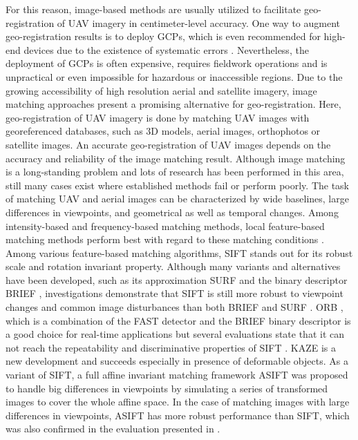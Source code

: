 For this reason, image-based methods are usually utilized to facilitate geo-registration of UAV imagery in centimeter-level accuracy.
One way to augment geo-registration results is to deploy GCPs, which is even recommended for high-end devices due to the existence of systematic errors \cite{gerke2016accuracy}. 
Nevertheless, the deployment of GCPs is often expensive, requires fieldwork operations and is unpractical or even impossible for hazardous or inaccessible regions. 
Due to the growing accessibility of high resolution aerial and satellite imagery, image matching approaches present a promising alternative for geo-registration. 
Here, geo-registration of UAV imagery is done by matching UAV images with georeferenced databases, such as 3D models, aerial images, orthophotos or satellite images.
An accurate geo-registration of UAV images depends on the accuracy and reliability of the image matching result.
Although image matching is a long-standing problem and lots of research has been performed in this area, still many cases exist where established methods fail or perform poorly.
The task of matching UAV and aerial images can be characterized by wide baselines, large differences in viewpoints, and geometrical as well as temporal changes.
Among intensity-based and frequency-based matching methods, local feature-based matching methods perform best with regard to these matching conditions \cite{zitova2003image}.
Among various feature-based matching algorithms, SIFT \cite{lowe2004distinctive} stands out for its robust scale and rotation invariant property. 
Although many variants and alternatives have been developed, such as its approximation SURF \cite{bay2008speeded} and the binary descriptor BRIEF \cite{calonder2010brief}, investigations demonstrate that SIFT is still more robust to viewpoint changes and common image disturbances than both BRIEF and SURF \cite{calonder2012brief}.
ORB \cite{rublee2011orb}, which is a combination of the FAST detector \cite{rosten2010faster} and the BRIEF binary descriptor is a good choice for real-time applications but several evaluations state that it can not reach the repeatability and discriminative properties of SIFT \cite{heinly2012comparative,bekele2013evaluation,dwarakanath2012evaluating,juan2009comparison}.
KAZE \cite{alcantarilla2012kaze} is a new development and succeeds especially in presence of deformable objects. 
As a variant of SIFT, a full affine invariant matching framework ASIFT \cite{yu2011asift} was proposed to handle big differences in viewpoints by simulating a series of transformed images to cover the whole affine space. 
In the case of matching images with large differences in viewpoints, ASIFT has more robust performance than SIFT, which was also confirmed in the evaluation presented in \cite{apollonio2014evaluation}.

